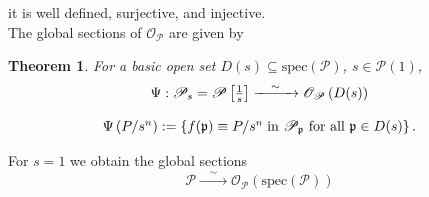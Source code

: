 \documentclass[leqno]{article}
\newcommand{\biop}{\mathscr{P}}
\newtheorem{theorem}{Theorem}
\numberwithin{equation}{section}
\begin{document}
it is well defined, surjective, and injective. \\
The global sections of $\mathscr{O}_{\biop}$ are given by 
\begin{theorem}
				For a basic open set $D(s)\subseteq \text{spec}(\biop)$, $s\in \biop(1)$,
				\begin{equation*}
								\begin{array}[H]{c}
								\Psi:\biop_{s}=\biop\left[ \frac{1}{s} \right]\xrightarrow{\quad\sim\quad}
								\mathscr{O}_{\biop}\left( D(s) \right) \\\\
								\Psi\left( P/s^{n} \right):= \left\{ f(\mathfrak{p})\equiv P/s^{n} \; \text{in
								$\biop_{\mathfrak{p}}$ for all $\mathfrak{p}\in D(s)$} \right\}.
								\end{array}
				\end{equation*}
				\label{thm:1}
\end{theorem}
For $s=1$ we obtain the global sections 
\begin{equation*}
				\biop\xrightarrow{\quad \sim \quad}\mathscr{O}_{\biop}(\text{spec}(\biop))
\end{equation*}
\end{document}
